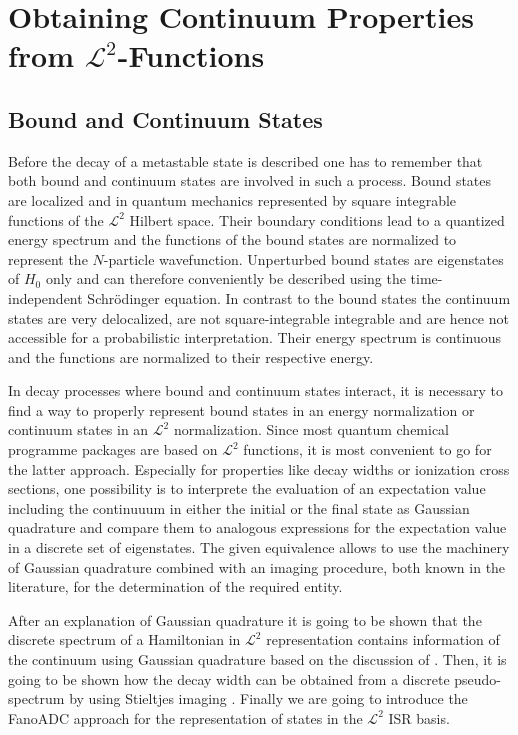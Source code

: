 \chapter{Obtaining Continuum Properties from $\mathcal{L}^2$-Functions}


\section{Bound and Continuum States}
Before the decay of a metastable state is described one has to remember
that both bound and continuum states are involved in such a process.
Bound states are localized and in quantum mechanics
represented by square integrable
functions of the $\mathcal{L}^2$ Hilbert space. Their boundary conditions
lead to a quantized energy spectrum and the functions of the bound states
are normalized
to represent the $N$-particle wavefunction.
Unperturbed bound states are eigenstates of $H_0$ only
and can therefore conveniently be described using the time-independent
Schrödinger equation.
In contrast to the bound states the
continuum states are very delocalized, are not square-integrable
integrable and are hence not accessible for a probabilistic interpretation.
Their energy spectrum is continuous and the functions are normalized to
their respective energy.

In decay processes
where bound and continuum states interact, it is necessary to find a way to
properly represent bound states in an energy normalization or continuum states
in an $\mathcal{L}^2$ normalization.
Since most quantum chemical programme packages are based
on $\mathcal{L}^2$ functions,
it is most convenient to go for the latter approach.
Especially for properties like decay widths or ionization cross sections, one
possibility is to interprete the evaluation of an expectation value
including the continuuum in either the initial or the final state as
Gaussian quadrature and compare them to analogous expressions for the
expectation value in a discrete set of eigenstates. The given equivalence
allows to use the machinery of Gaussian quadrature combined with an imaging
procedure, both known in the literature,
for the determination of the required entity. \cite{Reinhardt79}

After an explanation of Gaussian quadrature it is going to be shown that
the discrete spectrum of a Hamiltonian in $\mathcal{L}^2$ representation
contains information of the continuum using Gaussian quadrature
based on the discussion of \cite{Reinhardt79}.
Then, it is going to be shown how the decay width can be obtained from a
discrete pseudo-spectrum by using Stieltjes imaging \cite{Langhoff76,Corcoran77}.
Finally we are going to introduce the FanoADC approach for the representation of
states in the $\mathcal{L}^2$ \ac{ISR} basis.



